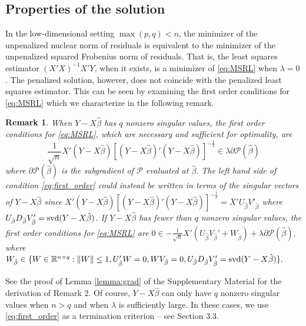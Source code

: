 \documentclass[12pt]{article}
\newtheorem{remark}{Remark}
\begin{document}
\subsection{Properties of the solution}
In the low-dimensional setting $\max (p,q) < n$, the minimizer of the unpenalized nuclear norm of residuals is equivalent to the minimizer of the unpenalized squared Frobenius norm of residuals. That is, the least squares estimator $(X'X)^{-1}X'Y$, when it exists, is a minimizer of \eqref{eq:MSRL} when $\lambda = 0$. 
The penalized solution, however, does not coincide with the penalized least squares estimator. This can be seen by examining the first order conditions for \eqref{eq:MSRL} which we characterize in the following remark.
\begin{remark} When $Y - X\hat{\beta}$ has $q$ nonzero singular values, the first order conditions for \eqref{eq:MSRL}, which are necessary and sufficient for optimality, are
 \begin{equation}  \frac{1}{\sqrt{n}} X'(Y - X\hat{\beta})[(Y - X\hat{\beta})'(Y - X\hat{\beta})]^{-\frac{1}{2}} \in \lambda \partial \mathcal{P}(\hat{\beta})\label{eq:first_order}
 \end{equation}
where $\partial \mathcal{P}(\hat{\beta})$ is the subgradient of $\mathcal{P}$ evaluated at $\hat{\beta}.$  The left hand side of condition \eqref{eq:first_order} could instead be written in terms of the singular vectors of $Y - X\hat{\beta}$ since
$ X'(Y - X\hat{\beta})[(Y - X\hat{\beta})'(Y - X\hat{\beta})]^{-\frac{1}{2}} = X'U_{\hat{\beta}}V'_{\hat{\beta}}$ where $U_{\hat{\beta}}D_{\hat{\beta}}V_{\hat{\beta}}' = {\rm svd}(Y - X \hat{\beta})$.
If $Y - X\hat{\beta}$ has fewer than $q$ nonzero singular values, the first order conditions for \eqref{eq:MSRL} are $0 \in -\frac{1}{\sqrt{n}}X'(U_{\hat{\beta}}V_{\hat{\beta}}' + W_{\hat{\beta}}) + \lambda \partial \mathcal{P}(\hat{\beta}),$
where $W_{\hat{\beta}} \in \{W \in \mathbb{R}^{n \times q}: \|W\| \leq 1, U_{\hat{\beta}}'W = 0,   WV_{\hat{\beta}} = 0, U_{\hat{\beta}}D_{\hat{\beta}}V_{\hat{\beta}}' = {\rm svd}(Y - X \hat{\beta})\}.$
\end{remark}
See the proof of Lemma \ref{lemma:grad} of the Supplementary Material for the derivation of Remark 2.
Of course, $Y - X\hat{\beta}$ can only have $q$ nonzero singular values when $n > q$ and when $\lambda$ is sufficiently large. In these cases, we use \eqref{eq:first_order} as a termination criterion -- see Section 3.3. %
\end{document}
